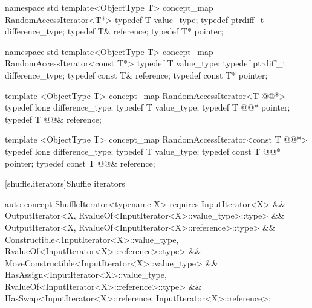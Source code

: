 \documentclass[american,twoside]{book}
\begin{document}
\begin{codeblock}
namespace std {
  template<ObjectType T> concept_map RandomAccessIterator<T*> {
    typedef T value_type;
    typedef ptrdiff_t difference_type;
    typedef T& reference;
    typedef T* pointer;
  }
}
\end{codeblock}


\begin{codeblock}
namespace std {
  template<ObjectType T> concept_map RandomAccessIterator<const T*> {
    typedef T value_type;
    typedef ptrdiff_t difference_type;
    typedef const T& reference;
    typedef const T* pointer;
  }
}
\end{codeblock}

\pnum
{}

\color{addclr}
\begin{codeblock}
  template <ObjectType T> concept_map RandomAccessIterator<T @@*> {
    typedef long difference_type;
    typedef T value_type;
    typedef T @@* pointer;
    typedef T @@& reference;
  }

  template <ObjectType T> concept_map RandomAccessIterator<const T @@*> {
    typedef long difference_type;
    typedef T value_type;
    typedef const T @@* pointer;
    typedef const T @@& reference;
  }
\end{codeblock}
\textcolor{addclr}{\exitnote}
\color{black}

[shuffle.iterators]{Shuffle iterators}
\pnum
{}

\color{ccadd}
\begin{codeblock}
auto concept ShuffleIterator<typename X> {
  requires InputIterator<X>
        && OutputIterator<X, RvalueOf<InputIterator<X>::value_type>::type>
        && OutputIterator<X, RvalueOf<InputIterator<X>::reference>::type>
        && Constructible<InputIterator<X>::value_type, 
                         RvalueOf<InputIterator<X>::reference>::type>
        && MoveConstructible<InputIterator<X>::value_type>
        && HasAssign<InputIterator<X>::value_type, 
                     RvalueOf<InputIterator<X>::reference>::type>
        && HasSwap<InputIterator<X>::reference, InputIterator<X>::reference>;
}
\end{codeblock}
\color{black}
\end{document}
